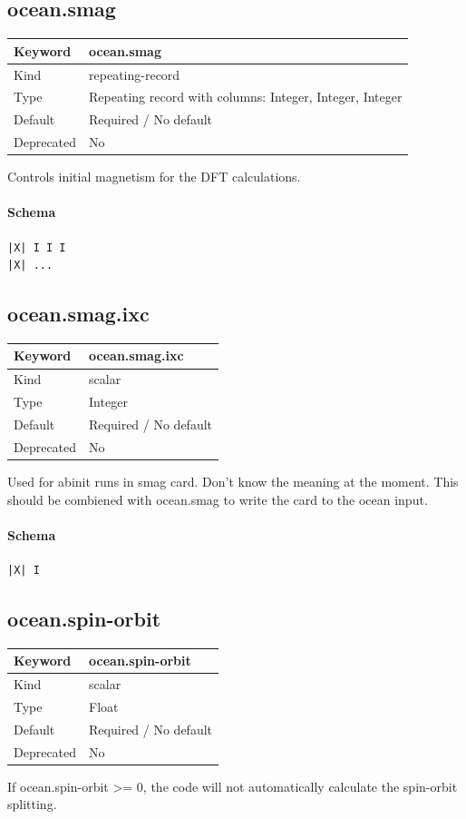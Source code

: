 \documentclass[11pt]{article}
\begin{document}
{{{{{\subsection{ocean.smag}
\label{kw:ocean-smag}
\begin{longtable}{|p{1.5in}|p{4.5in}|}
\hline
Keyword & ocean.smag \\
\hline
Kind & repeating-record \\
\hline
Type & Repeating record with columns: Integer, Integer, Integer \\
\hline
Default & Required / No default \\
\hline
Deprecated & No \\
\hline
\end{longtable}
 Controls initial magnetism for the DFT calculations.

\paragraph{Schema}
\begin{Verbatim}
|X| I I I
|X| ...
\end{Verbatim}

\subsection{ocean.smag.ixc}
\label{kw:ocean-smag-ixc}
\begin{longtable}{|p{1.5in}|p{4.5in}|}
\hline
Keyword & ocean.smag.ixc \\
\hline
Kind & scalar \\
\hline
Type & Integer \\
\hline
Default & Required / No default \\
\hline
Deprecated & No \\
\hline
\end{longtable}
 Used for abinit runs in smag card. Don't know the meaning at the moment.
 This should be combiened with ocean.smag to write the card to the ocean
 input.

\paragraph{Schema}
\begin{Verbatim}
|X| I
\end{Verbatim}

\subsection{ocean.spin-orbit}
\label{kw:ocean-spin-orbit}
\begin{longtable}{|p{1.5in}|p{4.5in}|}
\hline
Keyword & ocean.spin-orbit \\
\hline
Kind & scalar \\
\hline
Type & Float \\
\hline
Default & Required / No default \\
\hline
Deprecated & No \\
\hline
\end{longtable}
 If ocean.spin-orbit >= 0, the code will not automatically calculate the
 spin-orbit splitting.

}}}}}
\end{document}
